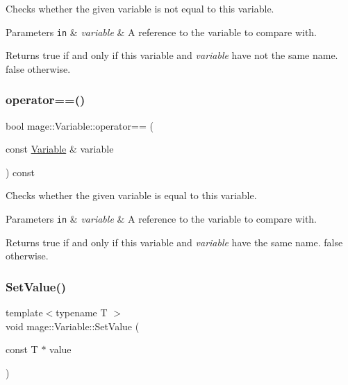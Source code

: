 Checks whether the given variable is not equal to this variable.


\begin{DoxyParams}[1]{Parameters}
\mbox{\tt in}  & {\em variable} & A reference to the variable to compare with. \\
\hline
\end{DoxyParams}
\begin{DoxyReturn}{Returns}
{\ttfamily true} if and only if this variable and {\itshape variable} have not the same name. {\ttfamily false} otherwise. 
\end{DoxyReturn}
\hypertarget{structmage_1_1_variable_a5d1f7965ca7d0e29f6879cda014e8fa9}{}\label{structmage_1_1_variable_a5d1f7965ca7d0e29f6879cda014e8fa9} 
\subsubsection{\texorpdfstring{operator==()}{operator==()}}
{\footnotesize\ttfamily bool mage\+::\+Variable\+::operator== (\begin{DoxyParamCaption}\item[{const \hyperlink{structmage_1_1_variable}{Variable} \&}]{variable }\end{DoxyParamCaption}) const}

Checks whether the given variable is equal to this variable.


\begin{DoxyParams}[1]{Parameters}
\mbox{\tt in}  & {\em variable} & A reference to the variable to compare with. \\
\hline
\end{DoxyParams}
\begin{DoxyReturn}{Returns}
{\ttfamily true} if and only if this variable and {\itshape variable} have the same name. {\ttfamily false} otherwise. 
\end{DoxyReturn}
\hypertarget{structmage_1_1_variable_afa9cfd0a42d8a15cccf7f49197648504}{}\label{structmage_1_1_variable_afa9cfd0a42d8a15cccf7f49197648504} 
\subsubsection{\texorpdfstring{Set\+Value()}{SetValue()}}
{\footnotesize\ttfamily template$<$typename T $>$ \\
void mage\+::\+Variable\+::\+Set\+Value (\begin{DoxyParamCaption}\item[{const T $\ast$}]{value }\end{DoxyParamCaption})}

